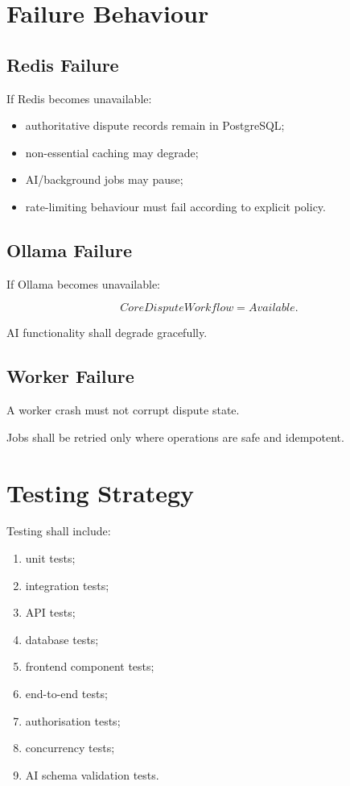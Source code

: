 \documentclass[11pt,a4paper]{article}
\begin{document}
\section{Failure Behaviour}

\subsection{Redis Failure}

If Redis becomes unavailable:

\begin{itemize}
    \item authoritative dispute records remain in PostgreSQL;
    \item non-essential caching may degrade;
    \item AI/background jobs may pause;
    \item rate-limiting behaviour must fail according to explicit policy.
\end{itemize}

\subsection{Ollama Failure}

If Ollama becomes unavailable:

\[
CoreDisputeWorkflow = Available.
\]

AI functionality shall degrade gracefully.

\subsection{Worker Failure}

A worker crash must not corrupt dispute state.

Jobs shall be retried only where operations are safe and idempotent.

\section{Testing Strategy}

Testing shall include:

\begin{enumerate}
    \item unit tests;
    \item integration tests;
    \item API tests;
    \item database tests;
    \item frontend component tests;
    \item end-to-end tests;
    \item authorisation tests;
    \item concurrency tests;
    \item AI schema validation tests.
\end{enumerate}
\end{document}
